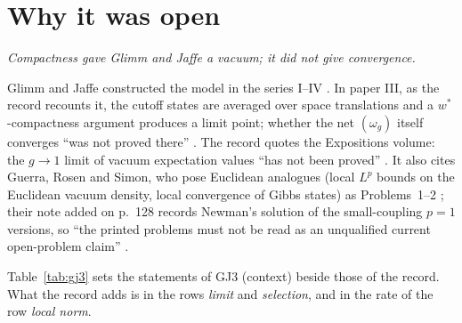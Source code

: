 \section{Why it was open}\label{sec:open}

\emph{Compactness gave Glimm and Jaffe a vacuum; it did not give convergence.}

Glimm and Jaffe constructed the model in the series I--IV \cite{GJ1,GJ2,GJ3,GJ4}. In
paper III, as the record recounts it, the cutoff states are averaged over space
translations and a $w^*$-compactness argument produces a limit point; whether the net
$(\omega_g)$ itself converges ``was not proved there'' . The record quotes
the Expositions volume: the $g\to1$ limit of vacuum expectation values ``has not been
proved'' \cite[\S4]{GJExp}. It also cites Guerra, Rosen and Simon, who pose Euclidean
analogues (local $L^p$ bounds on the Euclidean vacuum density, local convergence of
Gibbs states) as Problems~1--2 \cite[pp.~125--126]{GRS75}; their note added on p.~128
records Newman's solution of the small-coupling $p=1$ versions, so ``the printed problems
must not be read as an unqualified current open-problem claim'' .

Table~\ref{tab:gj3} sets the statements of GJ3 (context) beside those of the record.
What the record adds is in the rows \emph{limit} and \emph{selection}, and in the rate of
the row \emph{local norm}.

